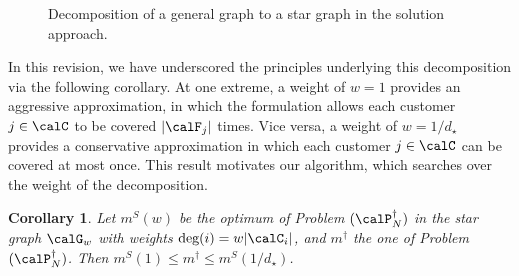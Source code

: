 \documentclass[11pt]{article}
\newtheorem{corollary}{Corollary}[]
\begin{document}
\begin{figure}[h!]
\centering
{}
\caption{Decomposition of a general graph to a star graph in the solution approach.}\label{fig:graph_decompose_AE}
\end{figure}

In this revision, we have underscored the principles underlying this decomposition via the following corollary. At one extreme, a weight of $w=1$ provides an aggressive approximation, in which the formulation allows each customer $j\in\calC$ to be covered $|\calF_j|$ times. Vice versa, a weight of $w=1/d_\star$ provides a conservative approximation in which each customer $j\in\calC$ can be covered at most once. This result motivates our algorithm, which searches over the weight of the decomposition.
\begin{corollary}\label{cor:heuristic}
Let $m^S(w)$ be the optimum of Problem $(\calP_N^\dagger)$ in the star graph $\calG_w$ with weights $\text{deg}(i)=w|\calC_i|$, and $m^\dagger$ the one of Problem $(\calP_N^\dagger)$. Then $m^S(1) \leq m^\dagger \leq m^S(1/d_\star)$.
\end{corollary}
\end{document}
